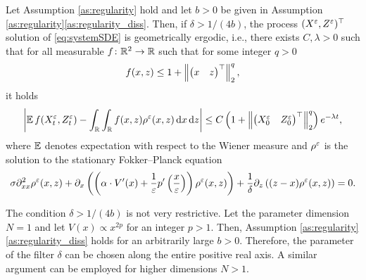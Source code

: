 \documentclass[10pt]{article}
\begin{document}
\begin{lemma}\label{lem:ergodicity} Let Assumption \ref{as:regularity} hold and let $b > 0$ be given in Assumption \ref{as:regularity}\ref{as:regularity_diss}. Then, if $\delta > 1/(4b)$, the process $(X^\varepsilon, Z^\varepsilon)^\top$ solution of \eqref{eq:systemSDE} is geometrically ergodic, i.e., there exists $C, \lambda > 0$ such that for all measurable $f\colon \mathbb{R}^2\to \mathbb{R}$ such that for some integer $q > 0$ 
	\begin{equation}
		f(x, z) \leq 1 + \left\|\begin{pmatrix} x & z \end{pmatrix}^\top\right\|_2^q,
	\end{equation}
	it holds
	\begin{equation}
		\left\lvert\operatorname{\mathbb{E}} f(X^\varepsilon_t, Z^\varepsilon_t) - \int_{\mathbb{R}}\int_{\mathbb{R}} f(x, z) \rho^\varepsilon(x, z) \,\mathrm{d} x \,\mathrm{d} z\right\rvert \leq C\left(1 + \left\|\begin{pmatrix} X^\varepsilon_0 & Z^\varepsilon_0 \end{pmatrix}^\top\right\|_2^q \right)e^{-\lambda t},
	\end{equation}
	where $\operatorname{\mathbb{E}}$ denotes expectation with respect to the Wiener measure and $\rho^\varepsilon$ is the solution to the stationary Fokker--Planck equation
	\begin{equation}
	\label{eq:FPsystem}
	\sigma \partial^2_{xx} \rho^\varepsilon(x,z) +  \partial_x \left( \left( \alpha \cdot V'(x) + \frac{1}{\varepsilon} p' \left ( \frac{x}{\varepsilon} \right ) \right ) \rho^\varepsilon(x,z) \right) + \frac{1}{\delta} \partial_z \left((z - x) \rho^\varepsilon(x,z)\right) = 0.
	\end{equation}
\end{lemma}

\begin{remark} The condition $\delta > 1 / (4b)$ is not very restrictive. Let the parameter dimension $N = 1$ and let $V(x) \propto x^{2p}$ for an integer $p > 1$. Then, Assumption \ref{as:regularity}\ref{as:regularity_diss} holds for an arbitrarily large $b > 0$. Therefore, the parameter of the filter $\delta$ can be chosen along the entire positive real axis. A similar argument can be employed for higher dimensions $N > 1$.
\end{remark}
\end{document}
